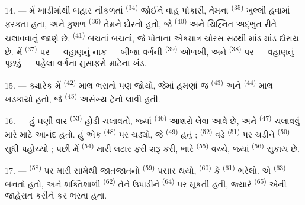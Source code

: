 \VUsaut{4.0mm}
\VUsaut{3.0mm}

14. --- મેં ખાડીમાંથી બહાર નીકળતાં 
\textsuperscript{(34)} જોઈને વાહ પોકારી, તેમના 
\textsuperscript{(35)} ખુલ્લી હવામાં ફરકતા હતા, અને કુશળ  \textsuperscript{(36)} તેમને દોરતો હતો, જે 
\textsuperscript{(40)} અને  ચિહ્નિત
 અદ્ભુત રીતે ચલાવવાનું જાણે છે,  \textsuperscript{(41)} બચતાં બચતાં, જે પોતાના
એકમાત્ર ચોરસ સઢથી માંડ માંડ દોરાય છે. મેં 
\textsuperscript{(37)} પર --- વહાણનું નાક --- બીજા વર્ગની
 \textsuperscript{(39)} ઓળખી, અને 
\textsuperscript{(38)} પર --- વહાણનું પૂછડું --- પહેલા વર્ગના મુસાફરો
માટેના ખંડ.

15. --- ક્યારેક મેં  \textsuperscript{(42)} માલ
ભરાતો પણ જોયો, જેમાં હમણાં જ  \textsuperscript{(43)} અને
 \textsuperscript{(44)} માલ ખડકાયો હતો, જે
 \textsuperscript{(45)} અસંખ્ય ટ્રેનો લાવી હતી.

\VUsaut{3.0mm}
\VUsaut{3.0mm}

16. --- હું ઘણી વાર  \textsuperscript{(53)} હોડી
ચલાવતો, જ્યાં  \textsuperscript{(46)} આશરો લેવા આવે છે,
અને  \textsuperscript{(47)} ચલાવવું મારે માટે આનંદ હતો.
હું એક  \textsuperscript{(48)} પર ચડ્યો, જે  \textsuperscript{(49)} હતું ; 
\textsuperscript{(52)} વડે  \textsuperscript{(51)} પર
ચડીને  \textsuperscript{(50)} સુધી પહોંચ્યો ; પછી મેં
 \textsuperscript{(54)} મારી લટાર ફરી શરૂ કરી, ભારે
 \textsuperscript{(55)} વચ્ચે, જ્યાં
 \textsuperscript{(56)} સુકાય છે.

17. ---  \textsuperscript{(58)} પર મારી સામેથી જાતજાતનો
 \textsuperscript{(59)} પસાર થયો, 
\textsuperscript{(60)} કે  \textsuperscript{(61)}
ભરેલો. એ  
\textsuperscript{(63)} બનતો હતો, અને શક્તિશાળી 
\textsuperscript{(62)} તેને ઉપાડીને  \textsuperscript{(64)}
પર મૂકતી હતી, જ્યારે  
\textsuperscript{(65)} એની જાહેરાત કરીને કર ભરતા હતા.

